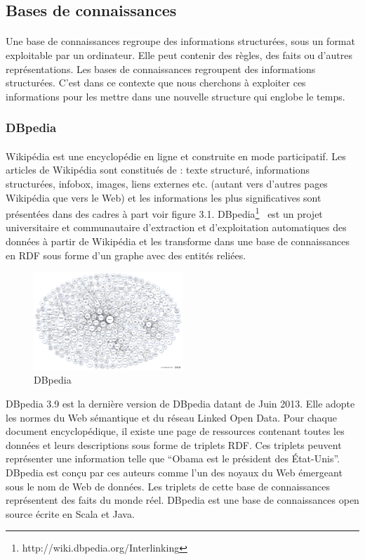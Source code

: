 \subsection{Bases de connaissances}
\paragraph{}
Une base de connaissances regroupe des informations structurées, sous un format exploitable par un ordinateur. Elle peut contenir des règles, des faits ou d'autres représentations. Les bases de connaissances regroupent des informations structurées. C’est dans ce contexte que nous cherchons à exploiter ces informations pour les mettre dans une nouvelle structure qui englobe le temps.
\subsubsection{DBpedia}
\paragraph{}
Wikipédia est une encyclopédie en ligne et construite en mode participatif.
Les articles de Wikipédia sont constitués de : texte structuré, informations structurées, infobox, images, liens externes etc. (autant vers d'autres pages Wikipédia que vers le Web) et les informations les plus significatives sont présentées dans des cadres à part voir figure 3.1. 
DBpedia\footnote{http://wiki.dbpedia.org/Interlinking}~\cite{lehmann2014} est un projet universitaire et communautaire d’extraction et d’exploitation automatiques des données à partir de Wikipédia et les transforme dans une base de connaissances en RDF sous forme d'un graphe avec des entités reliées.
\begin{figure}
\vspace{-15pt}
\begin{center}
\includegraphics[width=0.50\textwidth]{dbpedia.png}
\end{center}
\vspace{-15pt}
\caption{DBpedia}
\vspace{-10pt}
\end{figure}
DBpedia 3.9 est la dernière version de DBpedia datant de Juin 2013.
Elle adopte les normes du Web sémantique et du réseau Linked Open Data. Pour chaque document encyclopédique, il existe une page de ressources contenant toutes les données et leurs descriptions sous forme de triplets RDF. Ces triplets peuvent représenter une information telle que ``Obama est le président des État-Unis''.
DBpedia est conçu par ces auteurs comme l'un des noyaux du Web émergeant sous le nom de Web de données. Les triplets de cette base de connaissances représentent des faits du monde réel. DBpedia est une base de connaissances open source écrite en Scala et Java.
\newpage
